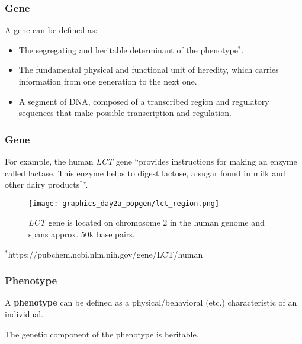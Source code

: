 \documentclass{beamer}
\newcommand{\1}{\ensuremath{\mathbf{1}}}
\begin{document}
\begin{frame}\frametitle{Gene}
	A gene can be defined as:
	\begin{itemize}
		\item The segregating and heritable determinant of the phenotype$^{*}$.
		\item The fundamental physical and functional unit of heredity, which carries information from one generation to the next one.
		\item A segment of DNA, composed of a transcribed region and regulatory sequences that make possible transcription and regulation.
	\end{itemize}
\end{frame}
%
%
%
\begin{frame}\frametitle{Gene}
	For example, the human \emph{LCT} gene ``provides instructions for making an enzyme called lactase. This enzyme helps to digest lactose, a sugar found in milk and other dairy products$^{*}$''.
	\begin{figure}
	\begin{center}
		\texttt{[image: graphics\_day2a\_popgen/lct\_region.png]}
	\end{center}
	\caption{\emph{LCT} gene is located on chromosome 2 in the human genome and spans approx. 50k base pairs.}
	\end{figure}
	 {\small $^{*}$https://pubchem.ncbi.nlm.nih.gov/gene/LCT/human}
\end{frame}
%
%
%
\begin{frame}\frametitle{Phenotype}
	A \textbf{phenotype} can be defined as a physical/behavioral (etc.) characteristic of an individual.\\[3ex]
	\begin{block}{}
		The genetic component of the phenotype is heritable.
	\end{block}
\end{frame}
%
%
%
\end{document}
